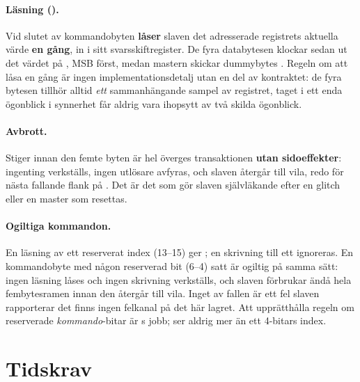 \paragraph{Läsning ().}
Vid slutet av kommandobyten \textbf{låser} slaven det adresserade registrets aktuella värde
\textbf{en gång}, in i sitt svarsskiftregister. De fyra databytesen klockar sedan ut det värdet på
, MSB först, medan mastern skickar dummybytes . Regeln om att låsa en gång är
ingen implementationsdetalj utan en del av kontraktet: de fyra bytesen tillhör alltid \emph{ett}
sammanhängande sampel av registret, taget i ett enda ögonblick \textemdash{}  i
synnerhet får aldrig vara ihopsytt av två skilda ögonblick.

\paragraph{Avbrott.}
Stiger  innan den femte byten är hel överges transaktionen \textbf{utan sidoeffekter}:
ingenting verkställs, ingen utlösare avfyras, och slaven återgår till vila, redo för nästa fallande
flank på . Det är det som gör slaven självläkande efter en glitch eller en master som
resettas.

\paragraph{Ogiltiga kommandon.}
En läsning av ett reserverat index (13--15) ger ; en skrivning till ett ignoreras.
En kommandobyte med någon reserverad bit (6--4) satt är ogiltig på samma sätt: ingen läsning låses
och ingen skrivning verkställs, och slaven förbrukar ändå hela fembytesramen innan den återgår till
vila. Inget av fallen är ett fel slaven rapporterar \textemdash{} det finns ingen felkanal på det här
lagret. Att upprätthålla regeln om reserverade \emph{kommando}-bitar är s jobb;
 ser aldrig mer än ett 4-bitars index.

\section{Tidskrav}
\label{app:protocol:timing}

